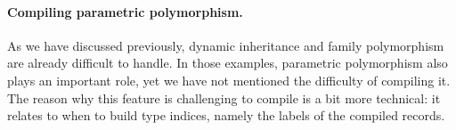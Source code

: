 \begin{comment}
However, there are some rare corner cases where this design causes trouble. Here
is an example:
\begin{lstlisting}
type A = (Int -> Int&Bool) -> Int;
type B = (Int -> Int&String) -> Int;
f (g: Int -> Int) = g 0;
f' = f : A&B;
f'' = f' : A;
f'' (\(x:Int) -> x,true)
\end{lstlisting}
Although the types of components of a merge are guaranteed to be disjoint, there
is no rule guaranteeing components of an intersection type to be disjoint.
Therefore, we can duplicate the function by casting \lstinline{f} to type
\lstinline{A&B}. Since \lstinline{A} and \lstinline{B} are not disjoint and have
the same return type, they would share the same type index
\lstinline{"func_int"}. We could not distinguish them by type indices, and the
field for \lstinline{f:B} would override that for \lstinline{f:A} in our
implementation. At first sight, it somehow makes sense because they are
essentially the same function so we do not need to keep two copies. However, the
trouble here is that their parameters have different type indices:
\lstinline{"func_(bool&int)"} for \lstinline{A}'s parameter and
\lstinline{"func_(int&string)"} for \lstinline{B}'s. This subtle difference
leads to slightly different compilation results for \lstinline{f:A} and
\lstinline{f:B}. The code above would go wrong as we do not distinguish them and
misuse \lstinline{f:B} as \lstinline{f:A}.

The fix is easy. Our formalization in \autoref{ch:calculi} uses a more precise
representation for function types: both the parameter and return types are
included in the type indices. Nevertheless, the issue is really rare, and we
have never encountered such a case in benchmarks. For performance reasons, we
still use the shorter type indices that only include return types in our
implementation. To make the compiled code more concise, we also use this
representation in \autoref{ch:compilation}.
\end{comment}

\paragraph{Compiling parametric polymorphism.}
As we have discussed previously, dynamic inheritance and family polymorphism are
already difficult to handle. In those examples, parametric polymorphism also
plays an important role, yet we have not mentioned the difficulty of compiling
it. The reason why this feature is challenging to compile is a bit more
technical: it relates to when to build type indices, namely the labels of the
compiled records.


